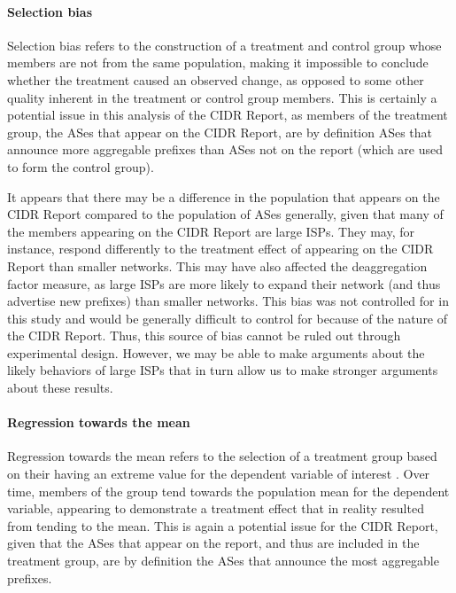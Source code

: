 \paragraph{Selection bias}

Selection bias refers to the construction of a treatment and control group
whose members are not from the same population, making it impossible to
conclude whether the treatment caused an observed change, as opposed to some
other quality inherent in the treatment or control group members. This is
certainly a potential issue in this analysis of the CIDR Report, as members of
the treatment group, the ASes that appear on the CIDR Report, are by definition
ASes that announce more aggregable prefixes than ASes not on the report (which
are used to form the control group).

It appears that there may be a difference in the population that appears on the
CIDR Report compared to the population of ASes generally, given that many of
the members appearing on the CIDR Report are large ISPs. They may, for
instance, respond differently to the treatment effect of appearing on the CIDR
Report than smaller networks. This may have also affected the deaggregation
factor measure, as large ISPs are more likely to expand their network (and thus
advertise new prefixes) than smaller networks.  This bias was not controlled
for in this study and would be generally difficult to control for because of
the nature of the CIDR Report. Thus, this source of bias cannot be ruled out
through experimental design. However, we may be able to make arguments about
the likely behaviors of large ISPs that in turn allow us to make stronger
arguments about these results.


\paragraph{Regression towards the mean}
Regression towards the mean refers to the selection of a treatment group based
on their having an extreme value for the dependent variable of interest
\cite{Babbie:2003uq}. Over time, members of the group tend towards the
population mean for the dependent variable, appearing to demonstrate a
treatment effect that in reality resulted from tending to the mean. This is
again a potential issue for the CIDR Report, given that the ASes that appear on
the report, and thus are included in the treatment group, are by definition the
ASes that announce the most aggregable prefixes.

